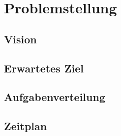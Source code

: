 
\chapter{Problemstellung}
\section{Vision}
\section{Erwartetes Ziel}
\section{Aufgabenverteilung}
\section{Zeitplan}
